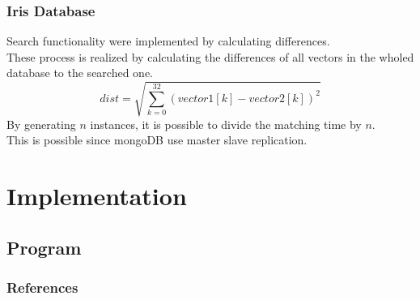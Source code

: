\documentclass{beamer}
\begin{document}
\begin{frame}
\frametitle{Iris Database} 
Search functionality were implemented by calculating differences.\\
These process is realized by calculating the differences of all vectors in the wholed database to the searched one.\\
\[
dist = \sqrt{\sum_{k=0}^{32}{(vector1[k]-vector2[k])}^2}
\]
By generating $n$ instances, it is possible to divide the matching time by $n$.\\
This is possible since mongoDB use master slave replication.
\end{frame}

\section{Implementation} 
\subsection{Program} 
\begin{frame}
\end{frame}
\begin{frame}
	[allowframebreaks] \frametitle{References} 
	 
	 
\end{frame}
\end{document}
